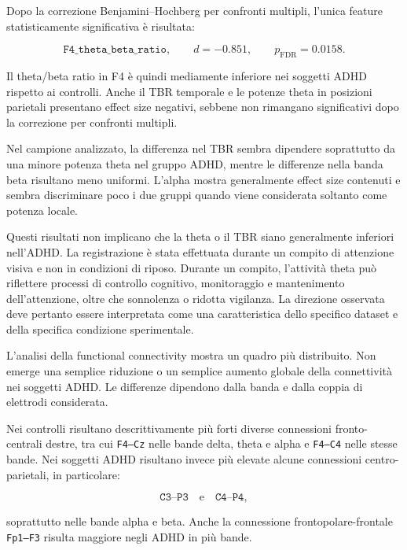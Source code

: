 Dopo la correzione Benjamini--Hochberg per confronti multipli, l'unica
feature statisticamente significativa è risultata:

\begin{equation}
	\texttt{F4\_theta\_beta\_ratio},
	\qquad
	d=-0.851,
	\qquad
	p_{\mathrm{FDR}}=0.0158.
\end{equation}

Il theta/beta ratio in F4 è quindi mediamente inferiore nei soggetti
ADHD rispetto ai controlli. Anche il TBR temporale e le potenze theta
in posizioni parietali presentano effect size negativi, sebbene non
rimangano significativi dopo la correzione per confronti multipli.

Nel campione analizzato, la differenza nel TBR sembra dipendere
soprattutto da una minore potenza theta nel gruppo ADHD, mentre le
differenze nella banda beta risultano meno uniformi. L'alpha mostra
generalmente effect size contenuti e sembra discriminare poco i due
gruppi quando viene considerata soltanto come potenza locale.

Questi risultati non implicano che la theta o il TBR siano
generalmente inferiori nell'ADHD. La registrazione è stata effettuata
durante un compito di attenzione visiva e non in condizioni di riposo.
Durante un compito, l'attività theta può riflettere processi di
controllo cognitivo, monitoraggio e mantenimento dell'attenzione,
oltre che sonnolenza o ridotta vigilanza. La direzione osservata deve
pertanto essere interpretata come una caratteristica dello specifico
dataset e della specifica condizione sperimentale.

L'analisi della functional connectivity mostra un quadro più
distribuito. Non emerge una semplice riduzione o un semplice aumento
globale della connettività nei soggetti ADHD. Le differenze dipendono
dalla banda e dalla coppia di elettrodi considerata.

Nei controlli risultano descrittivamente più forti diverse connessioni
fronto-centrali destre, tra cui \texttt{F4--Cz} nelle bande delta,
theta e alpha e \texttt{F4--C4} nelle stesse bande. Nei soggetti ADHD
risultano invece più elevate alcune connessioni centro-parietali,
in particolare:

\begin{equation}
	\texttt{C3--P3}
	\quad\text{e}\quad
	\texttt{C4--P4},
\end{equation}

soprattutto nelle bande alpha e beta. Anche la connessione
frontopolare-frontale \texttt{Fp1--F3} risulta maggiore negli ADHD in
più bande.

